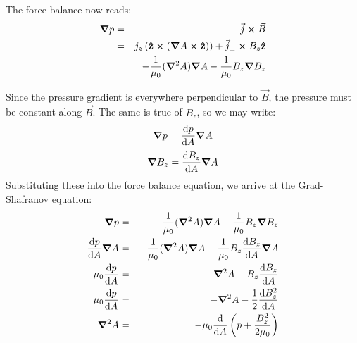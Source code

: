 \documentclass[%
 reprint,
 amsmath,amssymb,
 aps,
]{revtex4-2}
\begin{document}
The force balance now reads:
\begin{eqnarray}
\grad p & = & \vec j \cross \vec B \\
& = & j_z \left(\vu z \cross (\grad A \cross \vu z) \right) + \vec j_\perp \cross B_z \vu z \\
& = & - \frac{1}{\mu_0} (\grad ^2 A) \grad A - \frac{1}{\mu_0} B_z \grad B_z
\end{eqnarray}

Since the pressure gradient is everywhere perpendicular to $\vec B$, the pressure must be constant along $\vec B$. The same is true of $B_z$, so we may write:
\begin{equation}
\grad p = \dv{p}{A} \grad A
\end{equation}
\begin{equation}
\grad B_z = \dv{B_z}{A} \grad A
\end{equation}
Substituting these into the force balance equation, we arrive at the Grad-Shafranov equation:
\begin{eqnarray}
\grad p & = & - \frac{1}{\mu_0} (\grad ^2 A) \grad A - \frac{1}{\mu_0} B_z \grad B_z \\
\dv{p}{A} \grad A & = & - \frac{1}{\mu_0} (\grad ^2 A) \grad A - \frac{1}{\mu_0} B_z \dv{B_z}{A} \grad A \\
\mu_0 \dv{p}{A} & = & - \grad ^2 A - B_z \dv{B_z}{A} \\
\mu_0 \dv{p}{A} & = & - \grad ^2 A - \frac{1}{2}\dv{B_z^2}{A} \\
\grad ^2 A & = & - \mu_0 \dv{}{A} \left(p + \frac{B_z ^2}{2 \mu_0} \right)  \\
\end{eqnarray}
\end{document}
